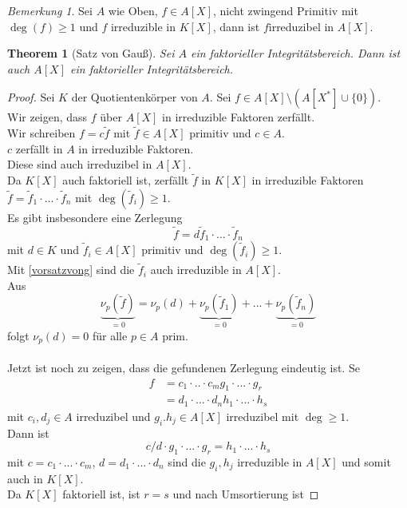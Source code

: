 \documentclass[10pt,a4paper]{article}
\theoremstyle{plain}
\newtheorem{theorem}{Theorem}[section]
\theoremstyle{definition}
\theoremstyle{remark}
\newtheorem*{bem*}{Bemerkung}
\begin{document}
	\begin{bem*}
		Sei $A$ wie Oben, $f\in A[X]$, nicht zwingend Primitiv mit $\deg(f)\geq1$ und $f$ irreduzible in $K[X]$, dann ist $f$irreduzibel in $A[X]$.
	\end{bem*}

	\begin{theorem}[Satz von Gauß]
		Sei $A$ ein faktorieller Integritätsbereich. Dann ist auch $A[X]$ ein faktorieller Integritätsbereich.
	\end{theorem}
	\begin{proof}
		Sei $K$ der Quotientenkörper von $A$. Sei $f\in A[X]\setminus(A[X^*]\cup\{0\})$.\\
		Wir zeigen, dass $f$ über $A[X]$ in irreduzible Faktoren zerfällt.\\
		Wir schreiben $f=c\tilde f$ mit $\tilde f\in A[X]$ primitiv und $c\in A$.\\
		$c$ zerfällt in $A$ in irreduzible Faktoren.\\
		Diese sind auch irreduzibel in $A[X]$.\\
		Da $K[X]$ auch faktoriell ist, zerfällt $\tilde f$ in $K[X]$ in irreduzible Faktoren $\tilde f=\tilde f_1\cdot...\cdot\tilde f_n$ mit $\deg(\tilde f_i)\geq 1$.\\
		Es gibt insbesondere eine Zerlegung
		\[\tilde f=d\tilde f_1\cdot...\cdot \tilde f_n\]
		mit $d\in K$ und $\tilde f_i\in A[X]$ primitiv und $\deg(\tilde f_i)\geq 1$.\\
		Mit \ref{vorsatzvong} sind die $\tilde f_i$ auch irreduzible in $A[X]$.\\
		Aus
		\[\underbrace{\nu_p(\tilde f)}_{=0}=\nu_p(d)+\underbrace{\nu_p(\tilde f_1)}_{=0}+...+\underbrace{\nu_p(\tilde f_n)}_{=0}\]
		folgt $\nu_p(d)=0$ für alle $p\in A$ prim.\\
		\\
		Jetzt ist noch zu zeigen, dass die gefundenen Zerlegung eindeutig ist. Se
		\begin{align*}
		f&=c_1\cdot..\cdot c_mg_1\cdot...\cdot g_r\\
		&=d_1\cdot...\cdot d_nh_1\cdot ...\cdot h_s
		\end{align*}
		mit $c_i,d_j\in A$ irreduzibel und $g_i.h_j\in A[X]$ irreduzibel mit $\deg\geq 1$.\\
		Dann ist
		\[c/d\cdot g_1\cdot...\cdot g_r=h_1\cdot...\cdot h_s\]
		mit $c=c_1\cdot...\cdot c_m$, $d=d_1\cdot...\cdot d_n$ sind die $g_i,h_j$ irreduzible in $A[X]$ und somit auch in $K[X]$.\\
		Da $K[X]$ faktoriell ist, ist $r=s$ und nach Umsortierung ist

\end{proof}
\end{document}
